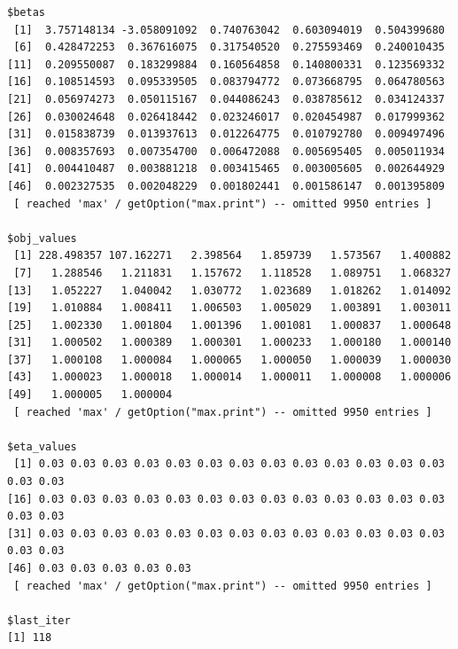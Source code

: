 \documentclass[
  letterpaper,
  DIV=11,
  numbers=noendperiod]{scrartcl}
\newenvironment{Shaded}{\begin{snugshade}}{\end{snugshade}}
\newcommand{\DecValTok}[1]{\textcolor[rgb]{0.68,0.00,0.00}{#1}}
\newcommand{\FunctionTok}[1]{\textcolor[rgb]{0.28,0.35,0.67}{#1}}
\newcommand{\NormalTok}[1]{\textcolor[rgb]{0.00,0.23,0.31}{#1}}
\newcommand{\SpecialCharTok}[1]{\textcolor[rgb]{0.37,0.37,0.37}{#1}}
\newcommand{\StringTok}[1]{\textcolor[rgb]{0.13,0.47,0.30}{#1}}
\begin{document}
\begin{verbatim}
$betas
 [1]  3.757148134 -3.058091092  0.740763042  0.603094019  0.504399680
 [6]  0.428472253  0.367616075  0.317540520  0.275593469  0.240010435
[11]  0.209550087  0.183299884  0.160564858  0.140800331  0.123569332
[16]  0.108514593  0.095339505  0.083794772  0.073668795  0.064780563
[21]  0.056974273  0.050115167  0.044086243  0.038785612  0.034124337
[26]  0.030024648  0.026418442  0.023246017  0.020454987  0.017999362
[31]  0.015838739  0.013937613  0.012264775  0.010792780  0.009497496
[36]  0.008357693  0.007354700  0.006472088  0.005695405  0.005011934
[41]  0.004410487  0.003881218  0.003415465  0.003005605  0.002644929
[46]  0.002327535  0.002048229  0.001802441  0.001586147  0.001395809
 [ reached 'max' / getOption("max.print") -- omitted 9950 entries ]

$obj_values
 [1] 228.498357 107.162271   2.398564   1.859739   1.573567   1.400882
 [7]   1.288546   1.211831   1.157672   1.118528   1.089751   1.068327
[13]   1.052227   1.040042   1.030772   1.023689   1.018262   1.014092
[19]   1.010884   1.008411   1.006503   1.005029   1.003891   1.003011
[25]   1.002330   1.001804   1.001396   1.001081   1.000837   1.000648
[31]   1.000502   1.000389   1.000301   1.000233   1.000180   1.000140
[37]   1.000108   1.000084   1.000065   1.000050   1.000039   1.000030
[43]   1.000023   1.000018   1.000014   1.000011   1.000008   1.000006
[49]   1.000005   1.000004
 [ reached 'max' / getOption("max.print") -- omitted 9950 entries ]

$eta_values
 [1] 0.03 0.03 0.03 0.03 0.03 0.03 0.03 0.03 0.03 0.03 0.03 0.03 0.03 0.03 0.03
[16] 0.03 0.03 0.03 0.03 0.03 0.03 0.03 0.03 0.03 0.03 0.03 0.03 0.03 0.03 0.03
[31] 0.03 0.03 0.03 0.03 0.03 0.03 0.03 0.03 0.03 0.03 0.03 0.03 0.03 0.03 0.03
[46] 0.03 0.03 0.03 0.03 0.03
 [ reached 'max' / getOption("max.print") -- omitted 9950 entries ]

$last_iter
[1] 118
\end{verbatim}

\begin{Shaded}
\end{Shaded}
\end{document}

